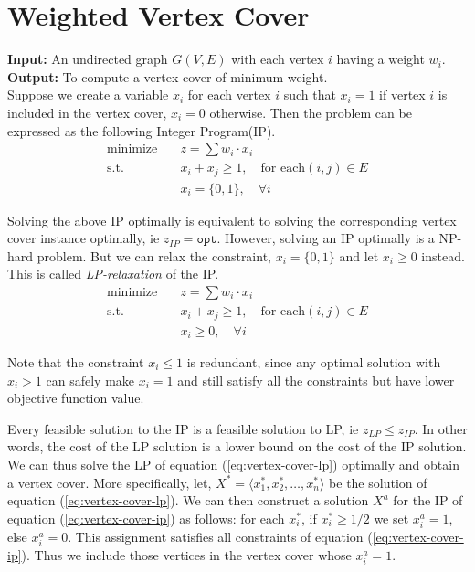 \documentclass[10pt]{article}
\numberwithin{equation}{section}
\begin{document}
\section{Weighted Vertex Cover}
\textbf{Input: } An undirected graph $G(V,E)$ with each vertex $i$ having a weight $w_i$. \\
\textbf{Output: } To compute a vertex cover of minimum weight. \\

Suppose we create a variable $x_i$ for each vertex $i$ such that $x_i = 1$ if vertex $i$ is included in the vertex cover, $x_i = 0$ otherwise. Then the problem can be expressed as the following Integer Program(IP).
\begin{align}\label{eq:vertex-cover-ip}
\text{minimize} \quad    & z = \sum w_i \cdot x_i    \\
\text{s.t.}     \quad    & x_i + x_j \geq 1, \quad \text{for each} (i, j) \in E \nonumber \\
                         & x_i = \{ 0, 1 \}, \quad \forall i \nonumber
\end{align}

Solving the above IP optimally is equivalent to solving the corresponding vertex cover instance optimally, ie $z_{IP} = \texttt{opt}$. However, solving an IP optimally is a NP-hard problem. But we can relax the constraint, $x_i = \{0,1\}$ and let $x_i \geq 0$ instead. This is called \emph{LP-relaxation} of the IP.
\begin{align}\label{eq:vertex-cover-lp}
\text{minimize} \quad    & z = \sum w_i \cdot x_i    \\
\text{s.t.}     \quad    & x_i + x_j \geq 1, \quad \text{for each} (i, j) \in E \nonumber \\
                         & x_i \geq 0, \quad \forall i \nonumber
\end{align}

Note that the constraint $x_i \leq 1$ is redundant, since any optimal solution with $x_i > 1$ can safely make $x_i = 1$ and still satisfy all the constraints but have lower objective function value.

Every feasible solution to the IP is a feasible solution to LP, ie $z_{LP} \leq z_{IP}$. In other words, the cost of the LP solution is a lower bound on the cost of the IP solution. We can thus solve the LP of equation (\ref{eq:vertex-cover-lp}) optimally and obtain a vertex cover. More specifically, let, $X^* = \langle x_1^*, x_2^*, \ldots , x_n^* \rangle$ be the solution of equation (\ref{eq:vertex-cover-lp}). We can then construct a solution $X^a$ for the IP of equation (\ref{eq:vertex-cover-ip}) as follows: for each $x_i^*$, if $x_i^* \geq 1/2$ we set $x_i^a = 1$, else $x_i^a = 0$. This assignment satisfies all constraints of equation (\ref{eq:vertex-cover-ip}). Thus we include those vertices in the vertex cover whose $x_i^a = 1$.
\end{document}
